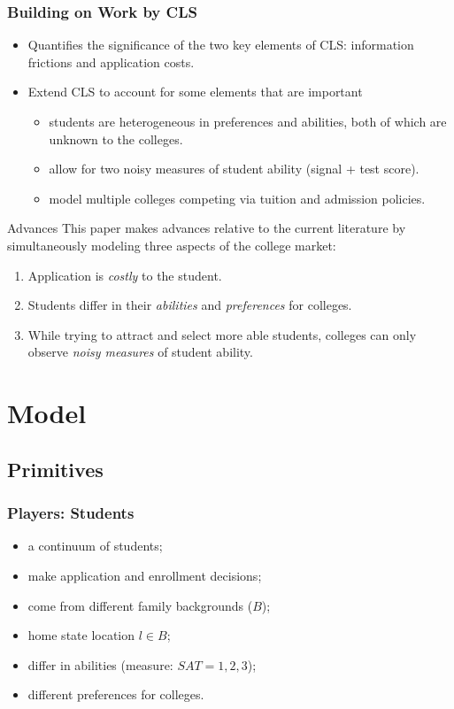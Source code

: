 \documentclass[10pt]{beamer}
\begin{document}
\begin{frame}[c]\frametitle{Building on Work by CLS}
\begin{itemize}
    \item Quantifies the significance of the two key elements of CLS: information frictions and application costs.
    \item Extend CLS to account for some elements that are important
    \begin{itemize}
        \item students are heterogeneous in preferences and abilities, both of which are unknown to the colleges.
        \item allow for two noisy measures of student ability (signal + test score).
        \item  model multiple colleges competing via tuition and admission policies.
    \end{itemize}

\end{itemize}

\end{frame}

\begin{frame}{Advances}
This paper makes advances relative to the current literature by simultaneously modeling three aspects of the college market:
\begin{enumerate}
    \item  Application is \textit{costly} to the student.
    \item  Students differ in their \textit{abilities} and \textit{preferences} for colleges.
    \item While trying to attract and select more able students, colleges can only observe \textit{noisy measures} of student ability.
\end{enumerate}

\end{frame}


\section{Model}
\subsection{Primitives}
\begin{frame}[c]\frametitle{Players: Students}

\begin{itemize}
    \item a continuum of students;
    \item make application and enrollment decisions;
    \item come from different family backgrounds ($B$);
    \item home state location $l\in B$;
    \item differ in abilities (measure: $SAT = 1,2,3$);
    \item different preferences for colleges.
\end{itemize}



\end{frame}
\end{document}
